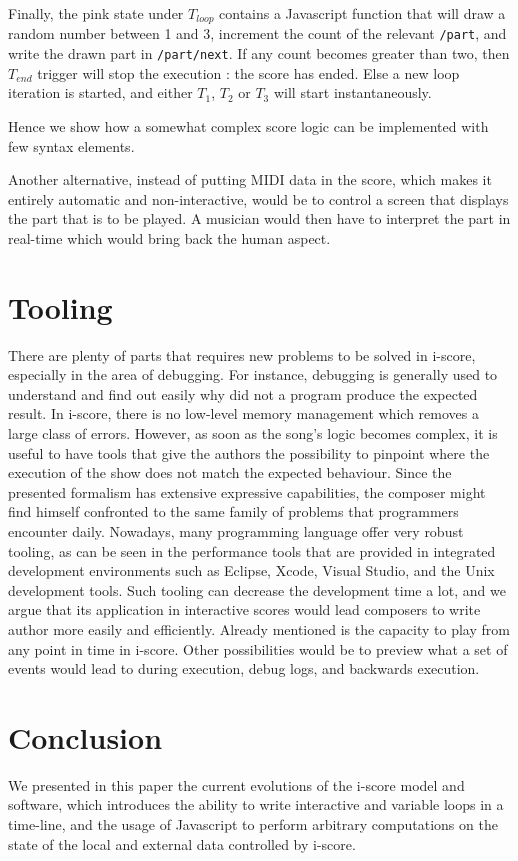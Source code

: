 \documentclass{article}
\begin{document}
Finally, the pink state under $T_{loop}$ contains a Javascript function 
that will draw a random number between 1 and 3, 
increment the count of the relevant \verb|/part|, 
and write the drawn part in \verb|/part/next|.
If any count becomes greater than two, then $T_{end}$
trigger will stop the execution : the score has ended. 
Else a new loop iteration is started, and either 
$T_1$, $T_2$ or $T_3$ will start instantaneously.

Hence we show how a somewhat complex score logic 
can be implemented with few syntax elements.

Another alternative, instead of putting MIDI data in the score,
which makes it entirely automatic and non-interactive,  
would be to control a screen that displays the part that is 
to be played.
A musician would then have to interpret the part 
in real-time which would bring back the human aspect.

\section{Tooling}
There are plenty of parts that requires new problems to be solved in i-score, especially in the area of debugging. 
For instance, debugging is generally used to understand and find out easily why did not a program produce the expected result.
In i-score, there is no low-level memory management which removes a large class of errors.
However, as soon as the song's logic becomes complex, it is useful to have tools that give the authors the possibility to pinpoint where the execution of the show does not match the expected behaviour.
Since the presented formalism has extensive expressive capabilities, the composer might find himself confronted to the same family of problems that programmers encounter daily.
Nowadays, many programming language offer very robust tooling, as can be seen in the performance tools that are provided in integrated development environments such as Eclipse, Xcode, Visual Studio, and the Unix development tools\cite{spinellis2014software}.
Such tooling can decrease the development time a lot, and we argue that its application in interactive scores would lead composers to write author more easily and efficiently.
Already mentioned is the capacity to play from any point in time in i-score. 
Other possibilities would be to preview what a set of events would lead to during execution, debug logs, and backwards execution. 
\section{Conclusion}
We presented in this paper the current evolutions of the i-score 
model and software, which introduces the ability to write interactive and variable loops in a time-line, 
and the usage of Javascript to perform arbitrary computations on the state of the local and external data controlled by i-score.
\end{document}
